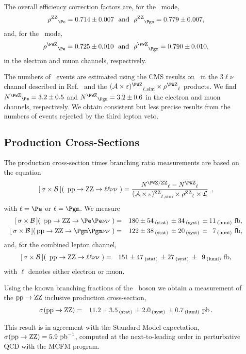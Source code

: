 The overall efficiency correction factors are, for the \ZZ\ mode, 
$${\rho^{\ZZ}}_{\Pe}=\RhoEleZZ\ \ \mathrm{and}\ \ {\rho^{\ZZ}}_{\Pgm}=\RhoMuoZZ,$$
and, for the \WZ\ mode,
$${\rho^{\WZ}}_{\Pe}=\RhoEleWZ\ \ \mathrm{and}\ \ {\rho^{\WZ}}_{\Pgm}=\RhoMuoWZ,$$
in the electron and muon channels, respectively.

The numbers of \WZ\ events are estimated using the CMS results on \WZ\ in the $3\ell\nu$ channel described in Ref.~\cite{CMS-PAS-EWK-11-010} and the ${(\mathcal{A} \times \varepsilon)^{\WZ}}_{\ell,\mathrm{sim}} \times {\rho^{\WZ}}_{\ell}$ products. We find $ {N^{\WZ}}_{\Pe} = \NbkgZWInZZee $ and $ {N^{\WZ}}_{\Pgm} =  \NbkgZWInZZmm$ in the electron and muon channels, respectively. We obtain consistent but less precise results from the numbers of events rejected by the third lepton veto.


\subsection{Production Cross-Sections}

The production cross-section times branching ratio measurements are based on the equation 
$$
   \SIGBRZZll = \frac{{N^{\WZ/\ZZ}}_{\ell} - {N^{\WZ}}_{\ell} }{ {(\mathcal{A} \times \varepsilon)^{\ZZ}}_{\ell,\mathrm{sim}} \times {\rho^{\ZZ}}_{\ell} \times \mathcal{L} }\ \, , 
$$
with $\ell=\Pe$ or $\ell = \Pgm$. We measure
\begin{eqnarray}
  \SIGBRZZee &=& \ZZElecXsect , \nonumber \\
  \SIGBRZZmm &=& \ZZMuonXsect , \nonumber 
\end{eqnarray}
and, for the combined lepton channel, 
\begin{eqnarray}
   [\,\sigma\times {\cal{B}}\,](\ \, \mathrm{pp}\to \mathrm{Z}\mathrm{Z} \to \ell\ell\nu\nu\ )  &=&  151 \pm 47\,_{\mathrm{(stat)}}\, \pm 27\,_{\mathrm{(syst)}}\, \pm \ \, 9\,_{\mathrm{(lumi)}} \ \mathrm{fb}   , \nonumber
\end{eqnarray}
with $\ell$ denotes either electron or muon. 

Using the known branching fractions of the \PZ\ boson we obtain a measurement of the $\mathrm{pp} \to \mathrm{Z}\mathrm{Z} $ inclusive production cross-section, 
\begin{eqnarray}
   \sigma( \mathrm{pp}\to\mathrm{Z}\mathrm{Z} )  &=&  11.2 \pm 3.5\,_{\mathrm{(stat)}}\, \pm 2.0\,_{\mathrm{(syst)}}\, \pm 0.7\,_{\mathrm{(lumi)}} \ \mathrm{pb}  \, .\nonumber
\end{eqnarray}

This result is in agreement with the Standard Model expectation, $\sigma( \mathrm{pp} \to \mathrm{Z}\mathrm{Z} ) = 5.9~\mathrm{pb}^{-1}$, computed at the next-to-leading order in perturbative QCD with the MCFM program.


